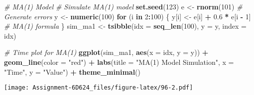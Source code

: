 \documentclass[
]{article}
\newenvironment{Shaded}{\begin{snugshade}}{\end{snugshade}}
\newcommand{\AttributeTok}[1]{\textcolor[rgb]{0.13,0.29,0.53}{#1}}
\newcommand{\CommentTok}[1]{\textcolor[rgb]{0.56,0.35,0.01}{\textit{#1}}}
\newcommand{\ControlFlowTok}[1]{\textcolor[rgb]{0.13,0.29,0.53}{\textbf{#1}}}
\newcommand{\DecValTok}[1]{\textcolor[rgb]{0.00,0.00,0.81}{#1}}
\newcommand{\FloatTok}[1]{\textcolor[rgb]{0.00,0.00,0.81}{#1}}
\newcommand{\FunctionTok}[1]{\textcolor[rgb]{0.13,0.29,0.53}{\textbf{#1}}}
\newcommand{\NormalTok}[1]{#1}
\newcommand{\OtherTok}[1]{\textcolor[rgb]{0.56,0.35,0.01}{#1}}
\newcommand{\SpecialCharTok}[1]{\textcolor[rgb]{0.81,0.36,0.00}{\textbf{#1}}}
\newcommand{\StringTok}[1]{\textcolor[rgb]{0.31,0.60,0.02}{#1}}
\begin{document}
\begin{Shaded}
\begin{Highlighting}[]
\CommentTok{\# MA(1) Model}
\CommentTok{\# Simulate MA(1) model}
\FunctionTok{set.seed}\NormalTok{(}\DecValTok{123}\NormalTok{)}
\NormalTok{e }\OtherTok{\textless{}{-}} \FunctionTok{rnorm}\NormalTok{(}\DecValTok{101}\NormalTok{) }\CommentTok{\# Generate errors}
\NormalTok{y }\OtherTok{\textless{}{-}} \FunctionTok{numeric}\NormalTok{(}\DecValTok{100}\NormalTok{)}
\ControlFlowTok{for}\NormalTok{ (i }\ControlFlowTok{in} \DecValTok{2}\SpecialCharTok{:}\DecValTok{100}\NormalTok{) \{}
\NormalTok{  y[i] }\OtherTok{\textless{}{-}}\NormalTok{ e[i] }\SpecialCharTok{+} \FloatTok{0.6} \SpecialCharTok{*}\NormalTok{ e[i }\SpecialCharTok{{-}} \DecValTok{1}\NormalTok{] }\CommentTok{\# MA(1) formula}
\NormalTok{\}}
\NormalTok{sim\_ma1 }\OtherTok{\textless{}{-}} \FunctionTok{tsibble}\NormalTok{(}\AttributeTok{idx =} \FunctionTok{seq\_len}\NormalTok{(}\DecValTok{100}\NormalTok{), }\AttributeTok{y =}\NormalTok{ y, }\AttributeTok{index =}\NormalTok{ idx)}

\CommentTok{\# Time plot for MA(1)}
\FunctionTok{ggplot}\NormalTok{(sim\_ma1, }\FunctionTok{aes}\NormalTok{(}\AttributeTok{x =}\NormalTok{ idx, }\AttributeTok{y =}\NormalTok{ y)) }\SpecialCharTok{+}
  \FunctionTok{geom\_line}\NormalTok{(}\AttributeTok{color =} \StringTok{"red"}\NormalTok{) }\SpecialCharTok{+}
  \FunctionTok{labs}\NormalTok{(}\AttributeTok{title =} \StringTok{"MA(1) Model Simulation"}\NormalTok{, }\AttributeTok{x =} \StringTok{"Time"}\NormalTok{, }\AttributeTok{y =} \StringTok{"Value"}\NormalTok{) }\SpecialCharTok{+}
  \FunctionTok{theme\_minimal}\NormalTok{()}
\end{Highlighting}
\end{Shaded}

\texttt{[image: Assignment-6D624\_files/figure-latex/96-2.pdf]}
\end{document}

